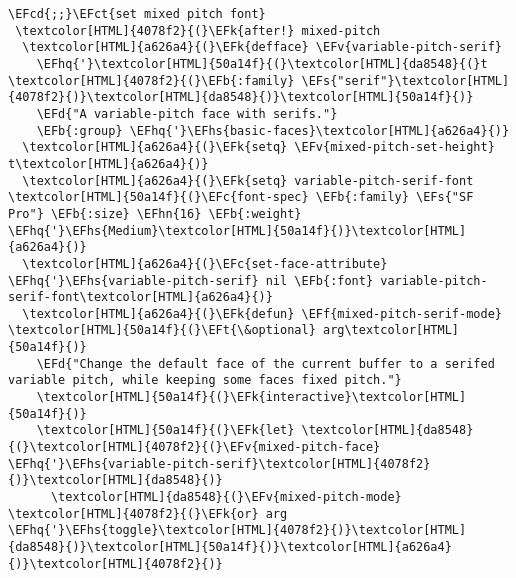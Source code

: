 \documentclass{scrartcl}
\newcommand{\EFk}[1]{\textcolor{EFk}{#1}} %
\newcommand{\EFd}[1]{\textcolor{EFd}{\textit{#1}}} %
\newcommand{\EFt}[1]{\textcolor{EFt}{#1}} %
\newcommand{\EFs}[1]{\textcolor{EFs}{#1}} %
\newcommand{\EFb}[1]{\textcolor{EFb}{#1}} %
\newcommand{\EFct}[1]{\textcolor{EFct}{#1}} %
\newcommand{\EFc}[1]{\textcolor{EFc}{#1}} %
\newcommand{\EFv}[1]{\textcolor{EFv}{#1}} %
\newcommand{\EFf}[1]{\textcolor{EFf}{#1}} %
\newcommand{\EFcd}[1]{\textcolor{EFcd}{#1}} %
\newcommand{\EFhn}[1]{\textcolor{EFhn}{\textbf{#1}}} %
\newcommand{\EFhq}[1]{\textcolor{EFhq}{#1}} %
\newcommand{\EFhs}[1]{\textcolor{EFhs}{#1}} %
\begin{document}
\begin{Code}
\begin{Verbatim}[]
\EFcd{;;}\EFct{set mixed pitch font}
 \textcolor[HTML]{4078f2}{(}\EFk{after!} mixed-pitch
  \textcolor[HTML]{a626a4}{(}\EFk{defface} \EFv{variable-pitch-serif}
    \EFhq{'}\textcolor[HTML]{50a14f}{(}\textcolor[HTML]{da8548}{(}t \textcolor[HTML]{4078f2}{(}\EFb{:family} \EFs{"serif"}\textcolor[HTML]{4078f2}{)}\textcolor[HTML]{da8548}{)}\textcolor[HTML]{50a14f}{)}
    \EFd{"A variable-pitch face with serifs."}
    \EFb{:group} \EFhq{'}\EFhs{basic-faces}\textcolor[HTML]{a626a4}{)}
  \textcolor[HTML]{a626a4}{(}\EFk{setq} \EFv{mixed-pitch-set-height} t\textcolor[HTML]{a626a4}{)}
  \textcolor[HTML]{a626a4}{(}\EFk{setq} variable-pitch-serif-font \textcolor[HTML]{50a14f}{(}\EFc{font-spec} \EFb{:family} \EFs{"SF Pro"} \EFb{:size} \EFhn{16} \EFb{:weight} \EFhq{'}\EFhs{Medium}\textcolor[HTML]{50a14f}{)}\textcolor[HTML]{a626a4}{)}
  \textcolor[HTML]{a626a4}{(}\EFc{set-face-attribute} \EFhq{'}\EFhs{variable-pitch-serif} nil \EFb{:font} variable-pitch-serif-font\textcolor[HTML]{a626a4}{)}
  \textcolor[HTML]{a626a4}{(}\EFk{defun} \EFf{mixed-pitch-serif-mode} \textcolor[HTML]{50a14f}{(}\EFt{\&optional} arg\textcolor[HTML]{50a14f}{)}
    \EFd{"Change the default face of the current buffer to a serifed variable pitch, while keeping some faces fixed pitch."}
    \textcolor[HTML]{50a14f}{(}\EFk{interactive}\textcolor[HTML]{50a14f}{)}
    \textcolor[HTML]{50a14f}{(}\EFk{let} \textcolor[HTML]{da8548}{(}\textcolor[HTML]{4078f2}{(}\EFv{mixed-pitch-face} \EFhq{'}\EFhs{variable-pitch-serif}\textcolor[HTML]{4078f2}{)}\textcolor[HTML]{da8548}{)}
      \textcolor[HTML]{da8548}{(}\EFv{mixed-pitch-mode} \textcolor[HTML]{4078f2}{(}\EFk{or} arg \EFhq{'}\EFhs{toggle}\textcolor[HTML]{4078f2}{)}\textcolor[HTML]{da8548}{)}\textcolor[HTML]{50a14f}{)}\textcolor[HTML]{a626a4}{)}\textcolor[HTML]{4078f2}{)}
\end{Verbatim}
\end{Code}
\end{document}
